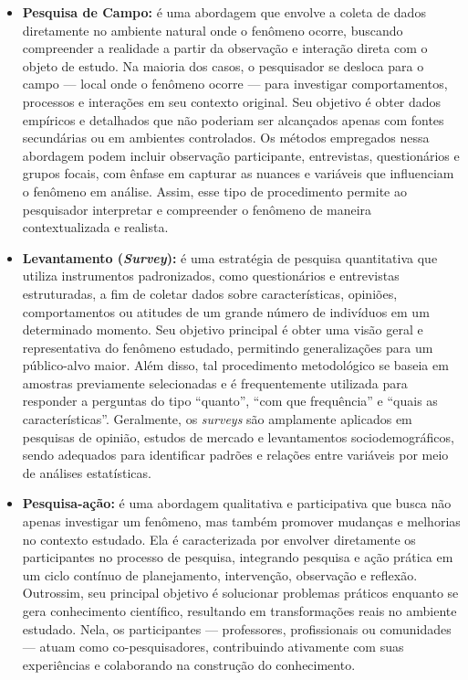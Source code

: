 \begin{itemize}[itemsep=0pt, leftmargin=2.3cm]
\begin{itemize}[itemsep=0pt]
            \item \textbf{Pesquisa de Campo:} é uma abordagem que envolve a coleta de dados diretamente no ambiente natural onde o fenômeno ocorre, buscando compreender a realidade a partir da observação e interação direta com o objeto de estudo. Na maioria dos casos, o pesquisador se desloca para o campo --- local onde o fenômeno ocorre --- para investigar comportamentos, processos e interações em seu contexto original. Seu objetivo é obter dados empíricos e detalhados que não poderiam ser alcançados apenas com fontes secundárias ou em ambientes controlados. Os métodos empregados nessa abordagem podem incluir observação participante, entrevistas, questionários e grupos focais, com ênfase em capturar as nuances e variáveis que influenciam o fenômeno em análise. Assim, esse tipo de procedimento permite ao pesquisador interpretar e compreender o fenômeno de maneira contextualizada e realista.
            \item \textbf{Levantamento (\textit{Survey}):} é uma estratégia de pesquisa quantitativa que utiliza instrumentos padronizados, como questionários e entrevistas estruturadas, a fim de coletar dados sobre características, opiniões, comportamentos ou atitudes de um grande número de indivíduos em um determinado momento. Seu objetivo principal é obter uma visão geral e representativa do fenômeno estudado, permitindo generalizações para um público-alvo maior. Além disso, tal procedimento metodológico se baseia em amostras previamente selecionadas e é frequentemente utilizada para responder a perguntas do tipo ``quanto'', ``com que frequência'' e ``quais as características''. Geralmente, os \textit{surveys} são amplamente aplicados em pesquisas de opinião, estudos de mercado e levantamentos sociodemográficos, sendo adequados para identificar padrões e relações entre variáveis por meio de análises estatísticas.
            \item \textbf{Pesquisa-ação:} é uma abordagem qualitativa e participativa que busca não apenas investigar um fenômeno, mas também promover mudanças e melhorias no contexto estudado. Ela é caracterizada por envolver diretamente os participantes no processo de pesquisa, integrando pesquisa e ação prática em um ciclo contínuo de planejamento, intervenção, observação e reflexão. Outrossim, seu principal objetivo é solucionar problemas práticos enquanto se gera conhecimento científico, resultando em transformações reais no ambiente estudado. Nela, os participantes --- professores, profissionais ou comunidades --- atuam como co-pesquisadores, contribuindo ativamente com suas experiências e colaborando na construção do conhecimento.
        \end{itemize}
\end{itemize}

